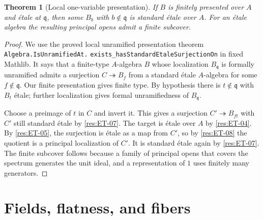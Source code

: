 \documentclass[11pt,oneside,openany]{book}
\newtheorem{theorem}{Theorem}[chapter]
\theoremstyle{definition}
\theoremstyle{remark}
\begin{document}
\begin{theorem}[Local one-variable presentation]\label{res:ET-09}
If $B$ is finitely presented over $A$ and \'{e}tale at
$\mathfrak q$, then some $B_b$ with $b\notin\mathfrak q$ is
standard \'{e}tale over $A$. For an \'{e}tale algebra the
resulting principal opens admit a finite subcover.
\end{theorem}
\begin{proof}
We use the proved local unramified presentation theorem
\texttt{Algebra.IsUnramifiedAt.}\allowbreak
\texttt{exists\_hasStandardEtaleSurjectionOn} in fixed Mathlib.
It says that a finite-type $A$-algebra $B$ whose localization
$B_{\mathfrak q}$ is formally unramified admits a surjection
$C\twoheadrightarrow B_f$ from a standard \'{e}tale $A$-algebra
for some $f\notin\mathfrak q$. Our finite presentation gives finite
type. By hypothesis there is $t\notin\mathfrak q$ with $B_t$ \'{e}tale;
further localization gives formal unramifiedness of $B_{\mathfrak q}$.

Choose a preimage of $t$ in $C$ and invert it. This gives a
surjection $C'\twoheadrightarrow B_{ft}$ with $C'$ still standard
\'etale by \ref{res:ET-07}. The target is \'{e}tale over $A$ by
\ref{res:ET-04}. By \ref{res:ET-05}, the surjection is \'{e}tale as
a map from $C'$, so by \ref{res:ET-08} the quotient is a principal
localization of $C'$. It is standard \'{e}tale again by
\ref{res:ET-07}. The finite subcover follows because a family of
principal opens that covers the spectrum generates the unit ideal,
and a representation of $1$ uses finitely many generators.
\end{proof}

\section{Fields, flatness, and fibers}
\end{document}
